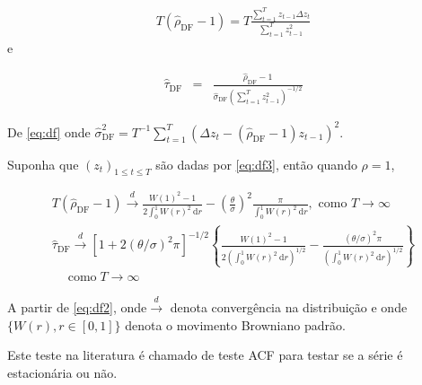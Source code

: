 \begin{eqnarray}
	T\left(\hat{\rho}_{\mathrm{DF}}-1\right)=T \frac{\sum_{t=1}^T z_{t-1} \Delta z_t}{\sum_{t=1}^T z_{t-1}^2}
\end{eqnarray}
e


\begin{eqnarray}
	\hat{\tau}_{\mathrm{DF}}&=&\frac{\hat{\rho}_{\mathrm{DF}}-1}{\hat{\sigma}_{\mathrm{DF}}\left(\sum_{t=1}^T z_{t-1}^2\right)^{-1 / 2}} \label{eq:df}
\end{eqnarray}

De \eqref{eq:df} onde $\hat{\sigma}_{\mathrm{DF}}^2=T^{-1} \sum_{t=1}^T\left(\Delta z_t-\left(\hat{\rho}_{\mathrm{DF}}-1\right) z_{t-1}\right)^2 .$



Suponha que $\left(z_t\right)_{1 \leq t \leq T}$ são dadas por \eqref{eq:df3}, então quando $\rho=1$,


\begin{eqnarray}
	T\left(\hat{\rho}_{\mathrm{DF}}-1\right) \stackrel{d}{\longrightarrow} \frac{W(1)^2-1}{2 \int_0^1 W(r)^2 \mathrm{~d} r}-\left(\frac{\theta}{\sigma}\right)^2 \frac{\pi}{\int_0^1 W(r)^2 \mathrm{~d} r}, \text { como } T \rightarrow \infty \\
	\hat{\tau}_{\mathrm{DF}} \stackrel{d}{\longrightarrow}\left[1+2(\theta / \sigma)^2 \pi\right]^{-1 / 2}\left\{\frac{W(1)^2-1}{2\left(\int_0^1 W(r)^2 \mathrm{~d} r\right)^{1 / 2}}-\frac{(\theta / \sigma)^2 \pi}{\left(\int_0^1 W(r)^2 \mathrm{~d} r\right)^{1 / 2}}\right\} \\
	\quad \operatorname{como} T \rightarrow \infty\label{eq:df2}
\end{eqnarray}

A partir de \eqref{eq:df2}, onde$\stackrel{d}{\longrightarrow}$ denota convergência na distribuição e onde $\{W(r), r \in[0,1]\}$ denota o movimento Browniano padrão.

Este teste na literatura é chamado de teste ACF para testar se a série é estacionária ou não.

